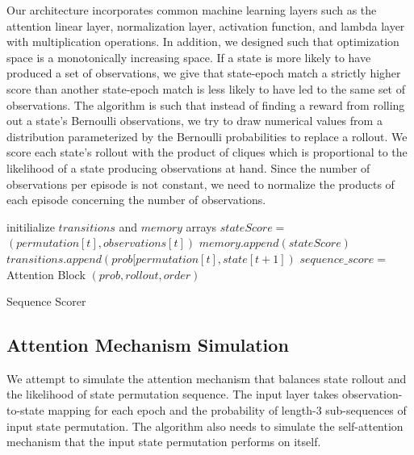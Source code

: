 \documentclass[10pt, conference, compsocconf]{IEEEtran}
\begin{document}
Our architecture incorporates common machine learning layers such as the attention linear layer, normalization layer, activation function, and lambda layer with multiplication operations. In addition, we designed such that optimization space is a monotonically increasing space. If a state is more likely to have produced a set of observations, we give that state-epoch match a strictly higher score than another state-epoch match is less likely to have led to the same set of observations. The algorithm is such that instead of finding a reward from rolling out a state's Bernoulli observations, we try to draw numerical values from a distribution parameterized by the Bernoulli probabilities to replace a rollout. We score each state's rollout with the product of cliques which is proportional to the likelihood of a state producing observations at hand. Since the number of observations per episode is not constant, we need to normalize the products of each episode concerning the number of observations. 

\begin{algorithm}[h]
initilialize $transitions$ and $memory$ arrays \;
{
    $stateScore = $ $(permutation[t], observations[t])$\;
    $memory.append(state Score)$\;
    $transitions.append(prob[permutation[t], state[t+1])$\;
}
$sequence\_score = $ {\sc Attention Block} $(prob, rollout, order)$\;
\caption{{\sc Sequence Scorer}}
\label{algo:duplicate}
\end{algorithm}



\subsection{Attention Mechanism Simulation}
 We attempt to simulate the attention mechanism that balances state rollout and the likelihood of state permutation sequence. The input layer takes observation-to-state mapping for each epoch and the probability of length-3 sub-sequences of input state permutation. The algorithm also needs to simulate the self-attention mechanism that the input state permutation performs on itself.

\end{document}
